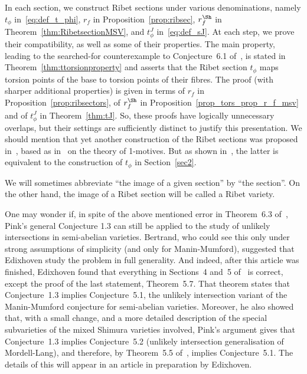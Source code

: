 \begin{Remark}
In each section, we construct Ribet sections under various
denominations, namely $t_\phi$ in~\eqref{eq:def_t_phi}, $r_f$ in
Proposition~\ref{prop:ribsec}, $r^\Sh_f$ in Theorem~\ref{thm:RibetsectionMSV},
and $t^J_\phi$ in~\eqref{eq:def_sJ}. At each step, we prove their
compatibility, as well as some of their properties. The main
property, leading to the searched-for counterexample to
Conjecture~6.1 of~\cite{Pink2}, is stated in
Theorem~\ref{thm:ttorsionproperty} and asserts that the Ribet section
$t_\phi$ maps torsion points of the base to torsion points of their
fibres. The proof (with sharper additional properties) is given in
terms of $r_f$ in Proposition~\ref{prop:ribsectors}, of $r^\Sh_f$ in
Proposition~\ref{prop_tors_prop_r_f_msv} and of
$t^J_\phi$ in Theorem~\ref{thm:tJ}. So, these proofs have logically
unnecessary overlaps, but their settings are sufficiently distinct
to justify this presentation. We should mention that yet another
construction of the Ribet sections was proposed
in~\cite{Bertrand11}, based as in~\cite{Jacquinot-Ribet} on the
theory of 1-motives. But as shown in~\cite{Chambert-Loir99}, the latter
is equivalent to the construction of $t_\phi$ in Section~\ref{sec2}.
\end{Remark}
\begin{Remark}
We will sometimes abbreviate ``the image of a given section'' by
``the section''. On the other hand, the image of a Ribet section
will be called a Ribet variety.
\end{Remark}
\begin{Remark}
One may wonder if, in spite of the above mentioned error in
Theorem~6.3 of~\cite{Pink2}, Pink's general Conjecture 1.3 can still
be applied to the study of unlikely intersections in semi-abelian
varieties. Bertrand, who could see this only under strong
assumptions of simplicity (and only for Manin-Mumford), suggested
that Edixhoven study the problem in full generality. And indeed,
after this article was finished, Edixhoven found that everything in
Sections~4 and~5 of~\cite{Pink2} is correct, except the proof of the
last statement, Theorem~5.7. That theorem states that Conjecture~1.3
implies Conjecture~5.1, the unlikely intersection variant of the
Manin-Mumford conjecture for semi-abelian varieties. Moreover, he
also showed that, with a small change, and a more detailed
description of the special subvarieties of the mixed Shimura
varieties involved, Pink's argument gives that Conjecture~1.3
implies Conjecture~5.2 (unlikely intersection generalisation of
Mordell-Lang), and therefore, by Theorem~5.5 of~\cite{Pink2},
implies Conjecture~5.1. The details of this will appear in an
article in preparation by Edixhoven.
\end{Remark}


